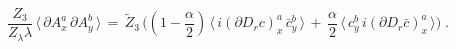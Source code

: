 \begin{equation}
  \label{ghDSEs3}
   \frac{Z_3}{Z_\lambda \lambda} \,  \langle \,
      \partial A^a_x \, \partial A^b_y \, \rangle \, = \,   \widetilde Z_3 \,
        \Big( (1-\frac \alpha 2) \, \langle  \, i (\partial D_r c)^a_x \, 
	\bar c^b_y\,
  \rangle \,  + \, \frac \alpha 2 \,  \langle  \,  c^b_y\,  
  i(\partial D_r \bar c)^a_x \,
  \rangle \Big)  \;.
\end{equation}

